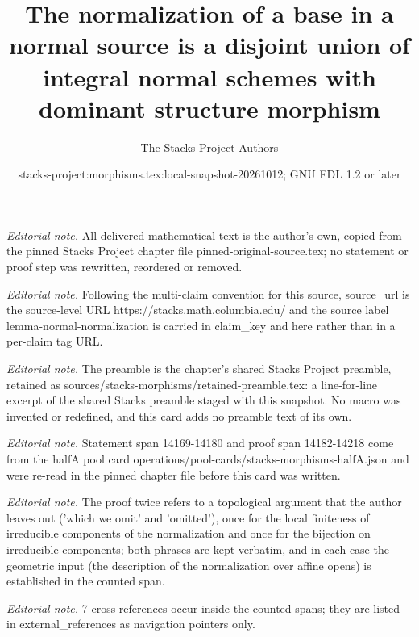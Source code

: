 \documentclass[10pt,a4paper]{amsart}
\title{The normalization of a base in a normal source is a disjoint union of integral normal schemes with dominant structure morphism}
\author{The Stacks Project Authors}
\date{stacks-project:morphisms.tex:local-snapshot-20261012; GNU FDL 1.2 or later}
\theoremstyle{plain}
\theoremstyle{definition}
\theoremstyle{remark}
\numberwithin{equation}{subsection}
\begin{document}
\maketitle
\noindent\textit{Editorial note.} All delivered mathematical text is the author's own, copied from the pinned Stacks Project chapter file pinned-original-source.tex; no statement or proof step was rewritten, reordered or removed.\par\medskip
\noindent\textit{Editorial note.} Following the multi-claim convention for this source, source\_url is the source-level URL https://stacks.math.columbia.edu/ and the source label lemma-normal-normalization is carried in claim\_key and here rather than in a per-claim tag URL.\par\medskip
\noindent\textit{Editorial note.} The preamble is the chapter's shared Stacks Project preamble, retained as sources/stacks-morphisms/retained-preamble.tex: a line-for-line excerpt of the shared Stacks preamble staged with this snapshot. No macro was invented or redefined, and this card adds no preamble text of its own.\par\medskip
\noindent\textit{Editorial note.} Statement span 14169-14180 and proof span 14182-14218 come from the halfA pool card operations/pool-cards/stacks-morphisms-halfA.json and were re-read in the pinned chapter file before this card was written.\par\medskip
\noindent\textit{Editorial note.} The proof twice refers to a topological argument that the author leaves out ('which we omit' and 'omitted'), once for the local finiteness of irreducible components of the normalization and once for the bijection on irreducible components; both phrases are kept verbatim, and in each case the geometric input (the description of the normalization over affine opens) is established in the counted span.\par\medskip
\noindent\textit{Editorial note.} 7 cross-references occur inside the counted spans; they are listed in external\_references as navigation pointers only.\par\medskip
\end{document}
